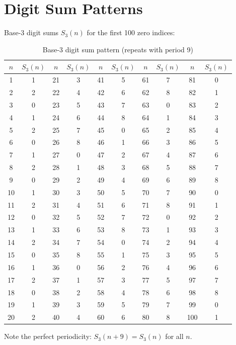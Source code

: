 \section{Digit Sum Patterns}

Base-3 digit sums $S_3(n)$ for the first 100 zero indices:

\begin{table}[h]
\centering
\begin{tabular}{cccccccccc}
\hline
$n$ & $S_3(n)$ & $n$ & $S_3(n)$ & $n$ & $S_3(n)$ & $n$ & $S_3(n)$ & $n$ & $S_3(n)$ \\
\hline
1 & 1 & 21 & 3 & 41 & 5 & 61 & 7 & 81 & 0 \\
2 & 2 & 22 & 4 & 42 & 6 & 62 & 8 & 82 & 1 \\
3 & 0 & 23 & 5 & 43 & 7 & 63 & 0 & 83 & 2 \\
4 & 1 & 24 & 6 & 44 & 8 & 64 & 1 & 84 & 3 \\
5 & 2 & 25 & 7 & 45 & 0 & 65 & 2 & 85 & 4 \\
6 & 0 & 26 & 8 & 46 & 1 & 66 & 3 & 86 & 5 \\
7 & 1 & 27 & 0 & 47 & 2 & 67 & 4 & 87 & 6 \\
8 & 2 & 28 & 1 & 48 & 3 & 68 & 5 & 88 & 7 \\
9 & 0 & 29 & 2 & 49 & 4 & 69 & 6 & 89 & 8 \\
10 & 1 & 30 & 3 & 50 & 5 & 70 & 7 & 90 & 0 \\
11 & 2 & 31 & 4 & 51 & 6 & 71 & 8 & 91 & 1 \\
12 & 0 & 32 & 5 & 52 & 7 & 72 & 0 & 92 & 2 \\
13 & 1 & 33 & 6 & 53 & 8 & 73 & 1 & 93 & 3 \\
14 & 2 & 34 & 7 & 54 & 0 & 74 & 2 & 94 & 4 \\
15 & 0 & 35 & 8 & 55 & 1 & 75 & 3 & 95 & 5 \\
16 & 1 & 36 & 0 & 56 & 2 & 76 & 4 & 96 & 6 \\
17 & 2 & 37 & 1 & 57 & 3 & 77 & 5 & 97 & 7 \\
18 & 0 & 38 & 2 & 58 & 4 & 78 & 6 & 98 & 8 \\
19 & 1 & 39 & 3 & 59 & 5 & 79 & 7 & 99 & 0 \\
20 & 2 & 40 & 4 & 60 & 6 & 80 & 8 & 100 & 1 \\
\hline
\end{tabular}
\caption{Base-3 digit sum pattern (repeats with period 9)}
\end{table}

Note the perfect periodicity: $S_3(n+9) = S_3(n)$ for all $n$.

